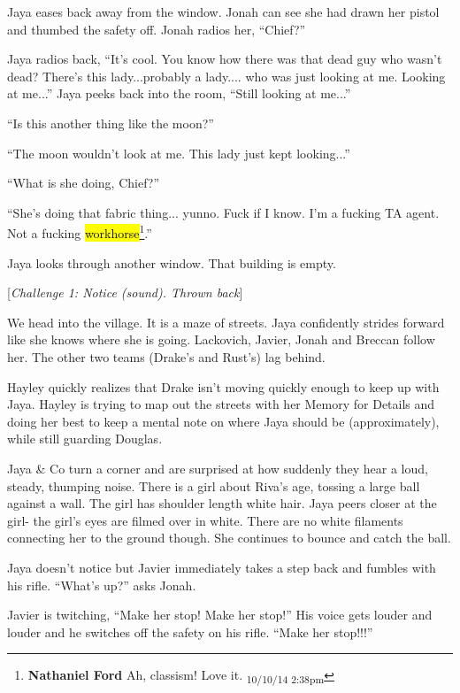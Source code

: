 Jaya eases back away from the window.  Jonah can see she had drawn her pistol and thumbed the safety off.  Jonah radios her, ``Chief?''

Jaya radios back, ``It's cool.  You know how there was that dead guy who wasn't dead?  There's this lady...probably a lady.... who was just looking at me.  Looking at me...'' Jaya peeks back into the room, ``Still looking at me...''

``Is this another thing like the moon?''

``The moon wouldn't look at me.  This lady just kept looking...''

``What is she doing, Chief?''

``She's doing that fabric thing... yunno.  Fuck if I know.  I'm a fucking TA agent.  Not a fucking \hl{workhorse}\footnote{\textbf{Nathaniel Ford }Ah, classism! Love it. \textsubscript{10/10/14 2:38pm}}.''

Jaya looks through another window.  That building is empty.

{[}\textit{Challenge 1: Notice (sound).  Thrown back}{]}



We head into the village.  It is a maze of streets.  Jaya confidently strides forward like she knows where she is going.  Lackovich, Javier, Jonah and Breccan follow her.  The other two teams (Drake's and Rust's) lag behind.



Hayley quickly realizes that Drake isn't moving quickly enough to keep up with Jaya.  Hayley is trying to map out the streets with her Memory for Details and doing her best to keep a mental note on where Jaya should be (approximately), while still guarding Douglas.



Jaya \& Co turn a corner and are surprised at how suddenly they hear a loud, steady, thumping noise.  There is a girl about Riva's age, tossing a large ball against a wall.  The girl has shoulder length white hair.  Jaya peers closer at the girl- the girl's eyes are filmed over in white.  There are no white filaments connecting her to the ground though.  She continues to bounce and catch the ball.



Jaya doesn't notice but Javier immediately takes a step back and fumbles with his rifle.  ``What's up?'' asks Jonah.  

Javier is twitching, ``Make her stop!  Make her stop!'' His voice gets louder and louder and he switches off the safety on his rifle.  ``Make her stop!!!''

